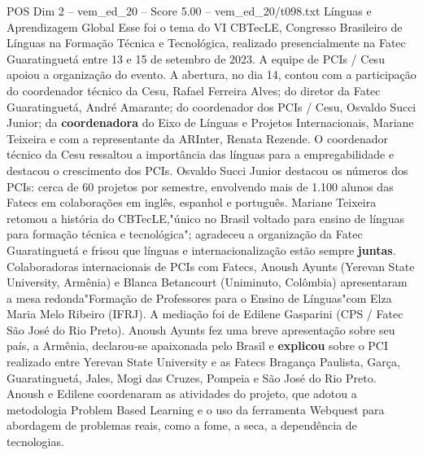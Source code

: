 \begin{textsample}{POS Dim 2 – vem\_ed\_20 – Score 5.00 – vem\_ed\_20/t098.txt}  \label{ex:f2_pos_100}
Línguas e Aprendizagem Global Esse foi o tema do VI CBTecLE, Congresso Brasileiro de Línguas na Formação Técnica e Tecnológica, realizado presencialmente na Fatec Guaratinguetá entre 13 e 15 de setembro de 2023.
A equipe de PCIs / Cesu apoiou a organização do evento.
A abertura, no dia 14, contou com a participação do coordenador técnico da Cesu, Rafael Ferreira Alves; do diretor da Fatec Guaratinguetá, André Amarante; do coordenador dos PCIs / Cesu, Osvaldo Succi Junior; da \textbf{coordenadora} do Eixo de Línguas e Projetos Internacionais, Mariane Teixeira e com a representante da ARInter, Renata Rezende.
O coordenador técnico da Cesu ressaltou a importância das línguas para a empregabilidade e destacou o crescimento dos PCIs.
Osvaldo Succi Junior destacou os números dos PCIs: cerca de 60 projetos por semestre, envolvendo mais de 1.100 alunos das Fatecs em colaborações em inglês, espanhol e português.
Mariane Teixeira retomou a história do CBTecLE,"único no Brasil voltado para ensino de línguas para formação técnica e tecnológica"; agradeceu a organização da Fatec Guaratinguetá e frisou que línguas e internacionalização estão sempre \textbf{juntas}.
Colaboradoras internacionais de PCIs com Fatecs, Anoush Ayunts (Yerevan State University, Armênia) e Blanca Betancourt (Uniminuto, Colômbia) apresentaram a mesa redonda"Formação de Professores para o Ensino de Línguas"com Elza Maria Melo Ribeiro (IFRJ).
A mediação foi de Edilene Gasparini (CPS / Fatec São José do Rio Preto).
Anoush Ayunts fez uma breve apresentação sobre seu país, a Armênia, declarou-se apaixonada pelo Brasil e \textbf{explicou} sobre o PCI realizado entre Yerevan State University e as Fatecs Bragança Paulista, Garça, Guaratinguetá, Jales, Mogi das Cruzes, Pompeia e São José do Rio Preto.
Anoush e Edilene coordenaram as atividades do projeto, que adotou a metodologia Problem Based Learning e o uso da ferramenta Webquest para abordagem de problemas reais, como a fome, a seca, a dependência de tecnologias.

\end{textsample}
